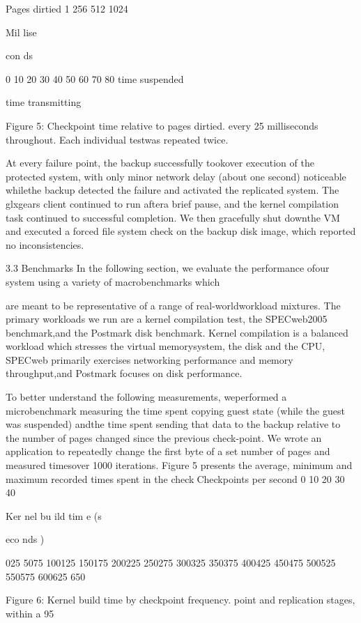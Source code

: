 Pages dirtied
1 256 512 1024

Mil
lise

con
ds

0
10
20
30
40
50
60
70
80 time suspended

time transmitting

Figure 5: Checkpoint time relative to pages dirtied.
every 25 milliseconds throughout. Each individual testwas repeated twice.

At every failure point, the backup successfully tookover execution of the protected system, with only minor network delay (about one second) noticeable whilethe backup detected the failure and activated the replicated system. The glxgears client continued to run aftera brief pause, and the kernel compilation task continued
to successful completion. We then gracefully shut downthe VM and executed a forced file system check on the
backup disk image, which reported no inconsistencies.

3.3 Benchmarks
In the following section, we evaluate the performance ofour system using a variety of macrobenchmarks which

are meant to be representative of a range of real-worldworkload mixtures. The primary workloads we run are a
kernel compilation test, the SPECweb2005 benchmark,and the Postmark disk benchmark. Kernel compilation is
a balanced workload which stresses the virtual memorysystem, the disk and the CPU, SPECweb primarily exercises networking performance and memory throughput,and Postmark focuses on disk performance.

To better understand the following measurements, weperformed a microbenchmark measuring the time spent
copying guest state (while the guest was suspended) andthe time spent sending that data to the backup relative to
the number of pages changed since the previous check-point. We wrote an application to repeatedly change the
first byte of a set number of pages and measured timesover 1000 iterations. Figure 5 presents the average, minimum and maximum recorded times spent in the checkCheckpoints per second
0 10 20 30 40

Ker
nel
 bu
ild 
tim
e (s

eco
nds
)

025
5075
100125
150175
200225
250275
300325
350375
400425
450475
500525
550575
600625
650

Figure 6: Kernel build time by checkpoint frequency.
point and replication stages, within a 95%


